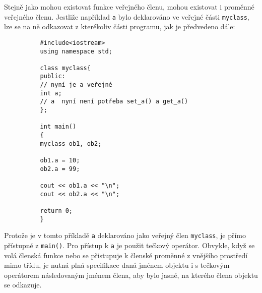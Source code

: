       \begin{example}
        Stejně jako mohou existovat funkce veřejného členu, mohou existovat i proměnné veřejného 
        členu. Jestliže například \lstinline[basicstyle=\ttfamily]!a! bylo deklarováno ve veřejné 
        části \lstinline[basicstyle=\ttfamily]!myclass!, lze se na ně odkazovat z kterékoliv části 
        programu, jak je předvedeno dále:
          \begin{lstlisting}
          #include<iostream>
          using namespace std;
  
          class myclass{
          public:
          // nyní je a veřejné
          int a;
          // a  nyní není potřeba set_a() a get_a()
          };
  
          int main()
          {
          myclass ob1, ob2;
  
          ob1.a = 10;
          ob2.a = 99;
  
          cout << ob1.a << "\n";
          cout << ob2.a << "\n";
  
          return 0;
          }
          \end{lstlisting}
        Protože je v tomto příkladě \lstinline[basicstyle=\ttfamily]!a! deklarováno jako veřejný 
        člen \lstinline[basicstyle=\ttfamily]!myclass!, je přímo přístupné z 
        \lstinline[basicstyle=\ttfamily]!main()!. Pro přístup k \lstinline[basicstyle=\ttfamily]!a! 
        je použit tečkový operátor. Obvykle, když se volá členská funkce nebo se přistupuje k 
        členské proměnné z vnějšího prostředí mimo třídu, je nutná plná specifikace daná jménem 
        objektu i s tečkovým operátorem následovaným jménem člena, aby bylo jasné, na kterého člena 
        objektu se odkazuje.
      \end{example}
  
